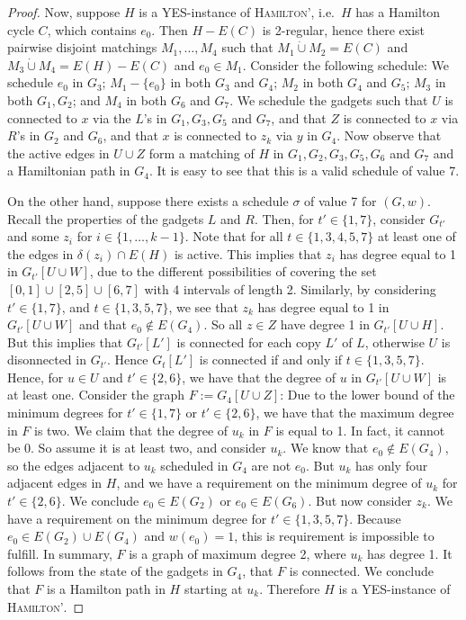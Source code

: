 \documentclass[runningheads]{llncs}
\newcommand{\set}[1]{\{ #1 \}}
\newcommand{\fromto}[2]{\set{#1, \ldots, #2}}
\newcommand{\dotunion}{\mathbin{\dot{\cup}}}
\begin{document}
\begin{proof}
Now, suppose $H$ is a YES-instance of \textsc{Hamilton'}, i.e.\ $H$ has a Hamilton cycle $C$, which contains $e_0$. Then $H - E(C)$ is 2-regular, hence there exist pairwise disjoint matchings $M_1, \ldots, M_4$ such that $M_1 \dotunion M_2 = E(C)$ and $M_3 \dotunion M_4 = E(H)-E(C)$ and $e_0 \in M_1$. Consider the following schedule: We schedule $e_0$ in $G_3$; $M_1-\set{e_0}$ in both $G_3$ and $G_4$; $M_2$ in both $G_4$ and $G_5$; $M_3$ in both $G_1, G_2$; and $M_4$ in both $G_6$ and $G_7$. We schedule the gadgets such that $U$ is connected to $x$ via the $L$'s in $G_1, G_3, G_5$ and $G_7$, and that $Z$ is connected to $x$ via $R$'s in $G_2$ and $G_6$, and that $x$ is connected to $z_k$ via $y$ in $G_4$. Now observe that the active edges in $U \cup Z$ form a matching of $H$ in $G_1, G_2, G_3, G_5, G_6$ and $G_7$ and a Hamiltonian path in $G_4$. It is easy to see that this is a valid schedule of value 7. 

On the other hand, suppose there exists a schedule $\sigma$ of value 7 for $(G, w)$.
Recall the properties of the gadgets $L$ and $R$. Then, for $t' \in \set{1, 7}$, consider $G_{t'}$ and some $z_i$ for $i \in \fromto{1}{k-1}$. Note that for all $t \in \set{1, 3, 4, 5, 7}$ at least one of the edges in $\delta(z_i) \cap E(H)$ is active. This implies that $z_i$ has degree equal to 1 in $G_{t'}[U \cup W]$, due to the different possibilities of covering the set $[0, 1] \cup [2, 5] \cup [6, 7]$ with 4 intervals of length 2. Similarly, by considering $t' \in \set{1, 7}$, and $t \in \set{1, 3, 5, 7}$, we see that $z_k$ has degree equal to 1 in $G_{t'}[U \cup W]$ and that $e_0 \not \in E(G_{4})$. So all $z \in Z$ have degree 1 in $G_{t'}[U \cup H]$. But this implies that $G_{t'}[L']$ is connected for each copy $L'$ of $L$, otherwise $U$ is disonnected in $G_{t'}$. Hence $G_t[L']$ is connected if and only if $t \in \set{1, 3, 5, 7}$. Hence, for $u \in U$ and $t' \in \set{2, 6}$, we have that the degree of $u$ in $G_{t'}[U \cup W]$ is at least one. Consider the graph $F := G_{4}[U \cup Z]$: Due to the lower bound of the minimum degrees for $t' \in \set{1, 7}$ or $t' \in \set{2, 6}$, we have that the maximum degree in $F$ is two. We claim that the degree of $u_k$ in $F$ is equal to 1. In fact, it cannot be 0. So assume it is at least two, and consider $u_k$. We know that $e_0 \not\in E(G_4)$, so the edges adjacent to $u_k$ scheduled in $G_4$ are not $e_0$. But $u_k$ has only four adjacent edges in $H$, and we have a requirement on the minimum degree of $u_k$ for $t' \in \set{2, 6}$. We conclude $e_0 \in E(G_2)$ or $e_0 \in E(G_6)$. But now consider $z_k$. We have a requirement on the minimum degree for $t' \in \set{1, 3, 5, 7}$. Because $e_0 \in E(G_2) \cup E(G_4)$ and $w(e_0) = 1$, this is requirement is impossible to fulfill.
In summary, $F$ is a graph of maximum degree 2, where $u_k$ has degree 1. It follows from the state of the gadgets in $G_4$, that $F$ is connected. We conclude that $F$ is a Hamilton path in $H$ starting at $u_k$. Therefore $H$ is a YES-instance of \textsc{Hamilton'}.
\end{proof}
\end{document}
